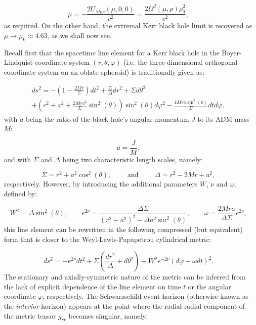 \documentclass{article}
\begin{document}
\begin{equation}
\mu = - \frac{2 U_{Mac} \left( \mu, 0, 0 \right)}{c^2} = \frac{2 \Omega^2 \left( \mu, \rho \right) \rho_{0}^{2}}{c^2},
\end{equation}
as required. On the other hand, the extremal Kerr black hole limit is recovered as ${\mu \to \mu_0 \approx 4.63}$, as we shall now see.

Recall first that the spacetime line element for a Kerr black hole in the Boyer-Lindquist coordinate system ${\left( r, \theta, \varphi \right)}$ (i.e. the three-dimensional orthogonal coordinate system on an oblate spheroid) is traditionally given as:

\begin{multline}
d s^2 = - \left( 1 - \frac{2 M r}{\Sigma} \right) d t^2 + \frac{\Sigma}{\Delta} d r^2 + \Sigma d \theta^2\\
+ \left( r^2 + a^2 + \frac{2 M r a^2}{\Sigma} \sin^2 \left( \theta \right) \right) \sin^2 \left( \theta \right) d \varphi^2 - \frac{4 M r a \sin^2 \left( \theta \right)}{\Sigma} d t d \varphi,
\end{multline}
with $a$ being the ratio of the black hole's angular momentum $J$ to its ADM mass $M$:

\begin{equation}
a = \frac{J}{M},
\end{equation}
and with ${\Sigma}$ and ${\Delta}$ being two characteristic length scales, namely:

\begin{equation}
\Sigma = r^2 + a^2 \cos^2 \left( \theta \right), \qquad \text{ and } \qquad \Delta = r^2 - 2M r + a^2,
\end{equation}
respectively. However, by introducing the additional parameters $W$, ${\nu}$ and ${\omega}$, defined by:

\begin{equation}
W^2 = \Delta \sin^2 \left( \theta \right), \qquad e^{2 \nu} = \frac{\Delta \Sigma}{\left( r^2 + a^2 \right)^2 - \Delta a^2 \sin^2 \left( \theta \right)}, \qquad \omega = \frac{2 M r a}{\Delta \Sigma} e^{2 \nu},
\end{equation}
this line element can be rewritten in the following compressed (but equivalent) form that is closer to the Weyl-Lewis-Papapetrou cylindrical metric:

\begin{equation}
d s^2 = - e^{2 \nu} d t^2 + \Sigma \left( \frac{d r^2}{\Delta} + d \theta^2 \right) + W^2 e^{-2 \nu} \left( d \varphi - \omega dt \right)^2.
\end{equation}
The stationary and axially-symmetric nature of the metric can be inferred from the lack of explicit dependence of the line element on time $t$ or the angular coordinate ${\varphi}$, respectively. The Schwarzschild event horizon (otherwise known as the \textit{interior} horizon) appears at the point where the radial-radial component of the metric tensor ${g_{r r}}$ becomes singular, namely:
\end{document}
